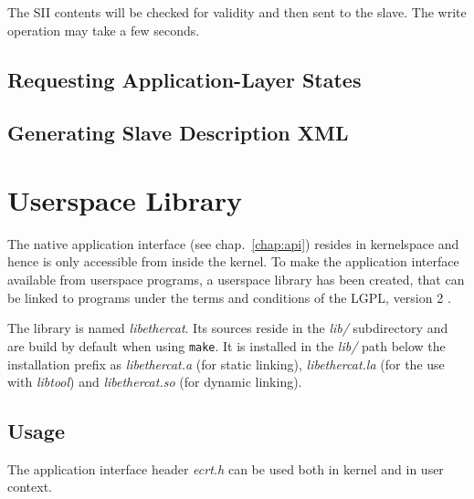 \documentclass[a4paper,12pt,BCOR6mm,bibtotoc,idxtotoc]{scrbook}
\begin{document}
The SII contents will be checked for validity and then sent to the slave. The
write operation may take a few seconds.


\subsection{Requesting Application-Layer States}




\subsection{Generating Slave Description XML}




\section{Userspace Library}
\label{sec:userlib}

The native application interface (see chap.~\ref{chap:api}) resides in
kernelspace and hence is only accessible from inside the kernel. To make the
application interface available from userspace programs, a userspace library
has been created, that can be linked to programs under the terms and
conditions of the LGPL, version 2 \cite{lgpl}.

The library is named \textit{libethercat}. Its sources reside in the
\textit{lib/} subdirectory and are build by default when using
\lstinline+make+. It is installed in the \textit{lib/} path below the
installation prefix as \textit{libethercat.a} (for static linking),
\textit{libethercat.la} (for the use with \textit{libtool}) and
\textit{libethercat.so} (for dynamic linking).

\subsection{Usage}

The application interface header \textit{ecrt.h} can be used both in kernel
and in user context.
\end{document}
